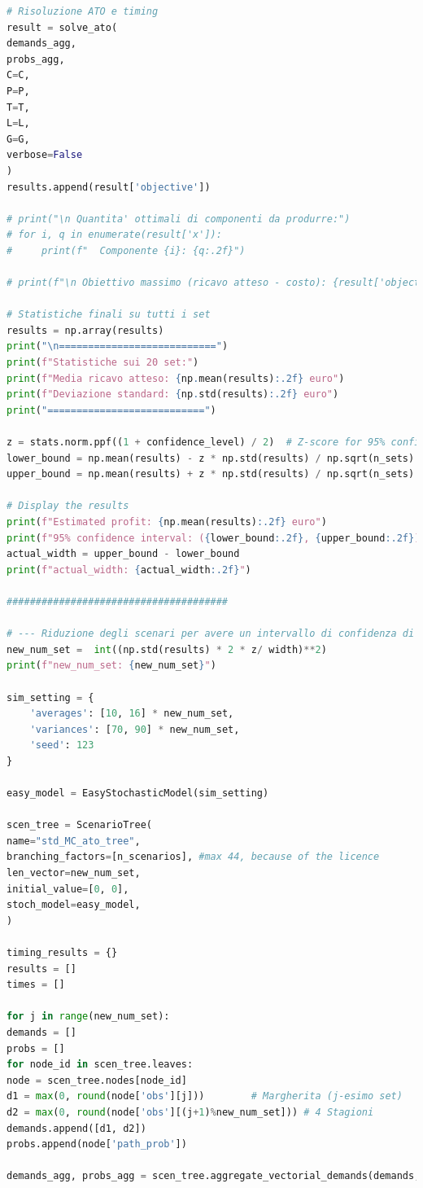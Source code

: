 \documentclass[a4paper,12pt]{article}
\begin{document}
\begin{lstlisting}[language=python,caption={Main of ATO problem},label={lst:main-ato}]
# Risoluzione ATO e timing
result = solve_ato(
demands_agg,
probs_agg,
C=C,
P=P,
T=T,
L=L,
G=G,
verbose=False
)
results.append(result['objective'])

# print("\n Quantita' ottimali di componenti da produrre:")
# for i, q in enumerate(result['x']):
#     print(f"  Componente {i}: {q:.2f}")

# print(f"\n Obiettivo massimo (ricavo atteso - costo): {result['objective']:.2f} euro")

# Statistiche finali su tutti i set
results = np.array(results)
print("\n===========================")
print(f"Statistiche sui 20 set:")
print(f"Media ricavo atteso: {np.mean(results):.2f} euro")
print(f"Deviazione standard: {np.std(results):.2f} euro")
print("===========================")

z = stats.norm.ppf((1 + confidence_level) / 2)  # Z-score for 95% confidence interval
lower_bound = np.mean(results) - z * np.std(results) / np.sqrt(n_sets)
upper_bound = np.mean(results) + z * np.std(results) / np.sqrt(n_sets)

# Display the results
print(f"Estimated profit: {np.mean(results):.2f} euro")
print(f"95% confidence interval: ({lower_bound:.2f}, {upper_bound:.2f})")
actual_width = upper_bound - lower_bound
print(f"actual_width: {actual_width:.2f}")

######################################

# --- Riduzione degli scenari per avere un intervallo di confidenza di 1 euro ---
new_num_set =  int((np.std(results) * 2 * z/ width)**2)
print(f"new_num_set: {new_num_set}")

sim_setting = {
	'averages': [10, 16] * new_num_set,
	'variances': [70, 90] * new_num_set,
	'seed': 123
}

easy_model = EasyStochasticModel(sim_setting)

scen_tree = ScenarioTree(
name="std_MC_ato_tree",
branching_factors=[n_scenarios], #max 44, because of the licence
len_vector=new_num_set,
initial_value=[0, 0],
stoch_model=easy_model,
)

timing_results = {}
results = []
times = []

for j in range(new_num_set):
demands = []
probs = []
for node_id in scen_tree.leaves:
node = scen_tree.nodes[node_id]
d1 = max(0, round(node['obs'][j]))        # Margherita (j-esimo set)
d2 = max(0, round(node['obs'][(j+1)%new_num_set])) # 4 Stagioni 
demands.append([d1, d2])
probs.append(node['path_prob'])

demands_agg, probs_agg = scen_tree.aggregate_vectorial_demands(demands, probs) 


\end{lstlisting}
\end{document}
